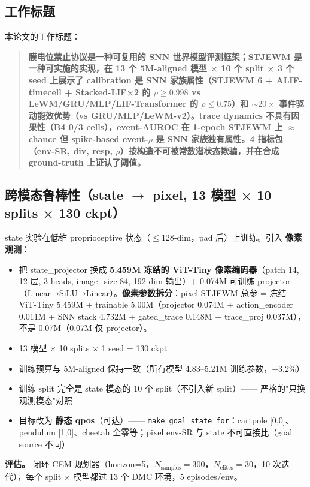 \documentclass[11pt,a4paper]{article}
\begin{document}
\subsection{工作标题}

本论文的工作标题：

\begin{quote}
\textbf{膜电位禁止协议是一种可复用的 SNN 世界模型评测框架；STJEWM 是一种可实施的实现，在 13 个 5M-aligned 模型 × 10 个 split × 3 个 seed 上展示了 calibration 是 SNN 家族属性（STJEWM 6 + ALIF-timecell + Stacked-LIF×2 的 $\rho \geq 0.998$ vs LeWM/GRU/MLP/LIF-Transformer 的 $\rho \leq 0.75$）和 $\sim 20\times$ 事件驱动能效优势（vs GRU/MLP/LeWM-v2）。trace dynamics 不具有因果性（B4 0/3 cells），event-AUROC 在 1-epoch STJEWM 上 $\approx$ chance 但 spike-based event-$\rho$ 是 SNN 家族独有属性。4 指标包（env-SR, div, resp, $\rho$）按构造不可被常数潜状态欺骗，并在合成 ground-truth 上证认了阈值。}
\end{quote}

\subsection{跨模态鲁棒性（state $\to$ pixel, 13 模型 × 10 splits × 130 ckpt）}

state 实验在低维 proprioceptive 状态（$\leq 128$-dim，pad 后）上训练。引入 \textbf{像素观测}：
\begin{itemize}[leftmargin=2em]
\item 把 state\_projector 换成 \textbf{5.459M 冻结的 ViT-Tiny 像素编码器}（patch 14, 12 层, 3 heads, image\_size 84, 192-dim 输出）+ 0.074M 可训练 projector（Linear→SiLU→Linear）。\textbf{像素参数拆分}：pixel STJEWM 总参 = 冻结 ViT-Tiny 5.459M + trainable 5.00M（projector 0.074M + action\_encoder 0.011M + SNN stack 4.732M + gated\_trace 0.148M + trace\_proj 0.037M），不是 0.07M（0.07M 仅 projector）。
\item 13 模型 × 10 splits × 1 seed = 130 ckpt
\item 训练预算与 5M-aligned 保持一致（所有模型 4.83--5.21M 训练参数，$\pm 3.2\%$）
\item 训练 split 完全是 state 模态的 10 个 split（不引入新 split）—— 严格的"只换观测模态"对照
\item 目标改为 \textbf{静态 qpos}（可达）—— \texttt{make\_goal\_state\_for}：cartpole [0,0]、pendulum [1,0]、cheetah 全零等；pixel env-SR 与 state 不可直接比（goal source 不同）
\end{itemize}

\textbf{评估。} 闭环 CEM 规划器（horizon=5，$N_{\text{samples}}=300$，$N_{\text{elites}}=30$，10 次迭代），每个 split × 模型都过 13 个 DMC 环境，5 episodes/env。
\end{document}

